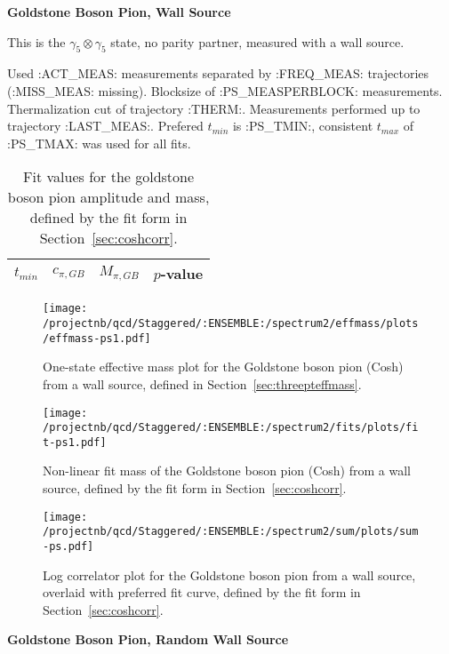 
\centerline{\textbf{Goldstone Boson Pion, Wall Source}}

This is the $\gamma_5 \otimes \gamma_5$ state, no parity partner, measured with a wall source.

{\small{Used :ACT_MEAS: measurements separated by :FREQ_MEAS: trajectories (:MISS_MEAS: missing). Blocksize of :PS_MEASPERBLOCK: measurements. Thermalization cut of trajectory :THERM:. Measurements performed up to trajectory :LAST_MEAS:. Prefered $t_{min}$ is :PS_TMIN:, consistent $t_{max}$ of :PS_TMAX: was used for all fits.}}

\begin{table}[ht!]
\centering
\scriptsize
\begin{tabular}{|c|c|c|c|}
\hline
 $t_{min}$ & $c_{\pi, GB}$ &  $M_{\pi, GB}$ & $p$-value \\
\hline

\end{tabular}
\caption{Fit values for the goldstone boson pion amplitude and mass, defined by the fit form in Section~\ref{sec:coshcorr}.}
\end{table}

\begin{multicols}{2}
\begin{figure}[H]
\centering
\texttt{[image: /projectnb/qcd/Staggered/:ENSEMBLE:/spectrum2/effmass/plots/effmass-ps1.pdf]}
\caption{One-state effective mass plot for the Goldstone boson pion (Cosh) from a wall source, defined in Section~\ref{sec:threepteffmass}.}
\end{figure}
\columnbreak
\begin{figure}[H]
\centering
\texttt{[image: /projectnb/qcd/Staggered/:ENSEMBLE:/spectrum2/fits/plots/fit-ps1.pdf]}
\caption{Non-linear fit mass of the Goldstone boson pion (Cosh) from a wall source, defined by the fit form in Section~\ref{sec:coshcorr}.}
\end{figure}
\end{multicols}

\begin{figure}[H]
\centering
\texttt{[image: /projectnb/qcd/Staggered/:ENSEMBLE:/spectrum2/sum/plots/sum-ps.pdf]}
\caption{Log correlator plot for the Goldstone boson pion from a wall source, overlaid with preferred fit curve, defined by the fit form in Section~\ref{sec:coshcorr}.}
\end{figure}

\clearpage

\centerline{\textbf{Goldstone Boson Pion, Random Wall Source}}

